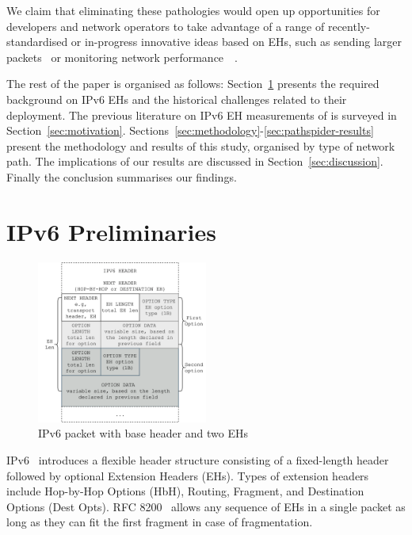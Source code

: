 \documentclass[conference]{IEEEtran}
\begin{document}
We claim that eliminating these pathologies would open up opportunities for
developers and network operators to take advantage of a range of recently-standardised or in-progress innovative ideas based on EHs, such as sending larger packets~\cite{rfc9268} or monitoring network
performance~\cite{rfc8250}~\cite{ietf-ippm-ioam-ipv6-options-10}.

The rest of the paper is organised as follows:  Section~\ref{sec:background} presents
the required background on IPv6 EHs and the historical challenges related to
their deployment.  The previous literature on IPv6
EH measurements of is surveyed in Section~\ref{sec:motivation}.
Sections~\ref{sec:methodology}-\ref{sec:pathspider-results} present the
methodology and results of this study, organised by type of network path.  The
implications of our results are discussed in Section~\ref{sec:discussion}.
Finally the conclusion summarises our findings.

\section{IPv6 Preliminaries}
\label{sec:background}

\label{sec:ipv6-option-deployment}

\begin{figure}
\centering
  \includegraphics[width=0.5\textwidth]{ehformat.png}
  \caption{IPv6 packet with base header and two EHs}
  \label{fig:eh-format}
\end{figure}


IPv6~\cite{rfc2460} introduces a flexible header structure consisting of a
fixed-length header followed by optional Extension Headers (EHs).  Types of
extension headers include Hop-by-Hop Options (HbH), Routing, Fragment, and
Destination Options (Dest Opts).  RFC 8200~\cite{RFC8200} allows any sequence
of EHs in a single packet as long as they can fit the first fragment in case of
fragmentation.
\end{document}
